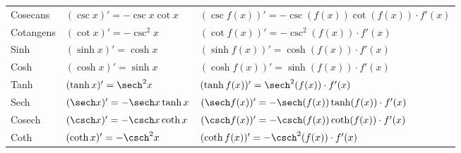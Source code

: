 \begin{table}[H]
\begin{tabular}{@{}>{\raggedright}p{2.65cm}ll@{}}
Cosecans & $(\csc x)' = -\csc x \cot x$ & $(\csc f(x))' = -\csc(f(x)) \cot(f(x)) \cdot f'(x)$ \\
Cotangens & $(\cot x)' = -\csc^2 x$ & $(\cot f(x))' = -\csc^2(f(x)) \cdot f'(x)$ \\
\midrule
Sinh & $(\sinh x)' = \cosh x$ & $(\sinh f(x))' = \cosh(f(x)) \cdot f'(x)$ \\
Cosh & $(\cosh x)' = \sinh x$ & $(\cosh f(x))' = \sinh(f(x)) \cdot f'(x)$ \\
Tanh & $(\tanh x)' = \sech^2 x$ & $(\tanh f(x))' = \sech^2(f(x)) \cdot f'(x)$ \\
Sech & $(\sech x)' = -\sech x \tanh x$ & $(\sech f(x))' = -\sech(f(x)) \tanh(f(x)) \cdot f'(x)$ \\
Cosech & $(\csch x)' = -\csch x \coth x$ & $(\csch f(x))' = -\csch(f(x)) \coth(f(x)) \cdot f'(x)$ \\
Coth & $(\coth x)' = -\csch^2 x$ & $(\coth f(x))' = -\csch^2(f(x)) \cdot f'(x)$ \\
\bottomrule
\end{tabular}
\endgroup
\end{table}
